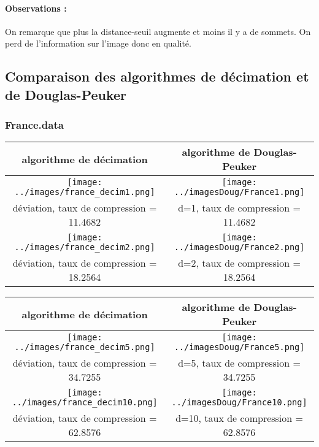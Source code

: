 \documentclass[11pt,a4paper]{article}
\begin{document}
\paragraph{Observations :}
On remarque que plus la distance-seuil augmente et moins il y a de sommets. On perd de l'information sur l'image donc
en qualité.

\subsection{Comparaison des algorithmes de décimation et de Douglas-Peuker} 
\subsubsection{France.data}


\begin{center}
 \begin{tabular}{|c|c|}
\hline
algorithme de décimation & algorithme de Douglas-Peuker \\
\hline
 \texttt{[image: ../images/france\_decim1.png]} & \texttt{[image: ../imagesDoug/France1.png]} \\
déviation, taux de compression = 11.4682   &  d=1, taux de compression = 11.4682  \\
\hline
 \texttt{[image: ../images/france\_decim2.png]} & \texttt{[image: ../imagesDoug/France2.png]} \\
déviation, taux de compression = 18.2564   & d=2, taux de compression = 18.2564  \\
\hline
 \end{tabular}
 \end{center}

\begin{center}
 \begin{tabular}{|c|c|}
\hline
algorithme de décimation & algorithme de Douglas-Peuker \\
\hline
 \texttt{[image: ../images/france\_decim5.png]} & \texttt{[image: ../imagesDoug/France5.png]} \\
déviation, taux de compression = 34.7255   &  d=5, taux de compression = 34.7255  \\
\hline
 \texttt{[image: ../images/france\_decim10.png]} & \texttt{[image: ../imagesDoug/France10.png]} \\
déviation, taux de compression = 62.8576 & d=10, taux de compression = 62.8576 \\
\hline
 \end{tabular}
 \end{center}
\end{document}
